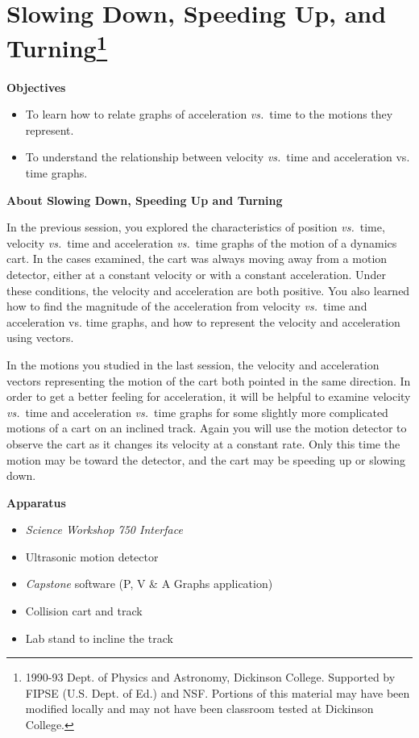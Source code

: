 
\section{Slowing Down, Speeding Up, and Turning\footnote{
1990-93 Dept. of Physics and Astronomy, Dickinson College. Supported by FIPSE
(U.S. Dept. of Ed.) and NSF. Portions of this material may have been modified
locally and may not have been classroom tested at Dickinson College.
}}

\makelabheader %

\medskip
\textbf{Objectives }

\begin{itemize}
\item To learn how to relate graphs of acceleration \textit{vs.}~time to the motions they represent. 
\item To understand the relationship between velocity \textit{vs.}~time and acceleration vs.
time graphs.
\end{itemize}

\medskip
\textbf{About Slowing Down, Speeding Up and Turning }

In the previous session, you explored the characteristics of position \textit{vs.}~time,
velocity \textit{vs.}~time and acceleration  \textit{vs.}~time graphs of the motion of a dynamics
cart. In the cases examined, the cart was always moving away from a motion detector,
either at a constant velocity or with a constant acceleration. Under these conditions,
the velocity and acceleration are both positive. You also learned how to find
the magnitude of the acceleration from velocity \textit{vs.}~time and acceleration vs.
time graphs, and how to represent the velocity and acceleration using vectors. 

In the motions you studied in the last session, the velocity and acceleration
vectors representing the motion of the cart both pointed in the same direction.
In order to get a better feeling for acceleration, it will be helpful to examine
velocity \textit{vs.}~time and acceleration \textit{vs.}~time graphs for some slightly more complicated
motions of a cart on an inclined track. Again you will use the motion detector
to observe the cart as it changes its velocity at a constant rate. Only this
time the motion may be toward the detector, and the cart may be speeding up
or slowing down.

\medskip
\textbf{Apparatus }

\begin{itemize}
\item \textit{Science Workshop 750 Interface}
\item Ultrasonic motion detector 
\item \textit{Capstone} software (P, V \& A Graphs application)
\item Collision cart and track 
\item Lab stand to incline the track
\end{itemize}

